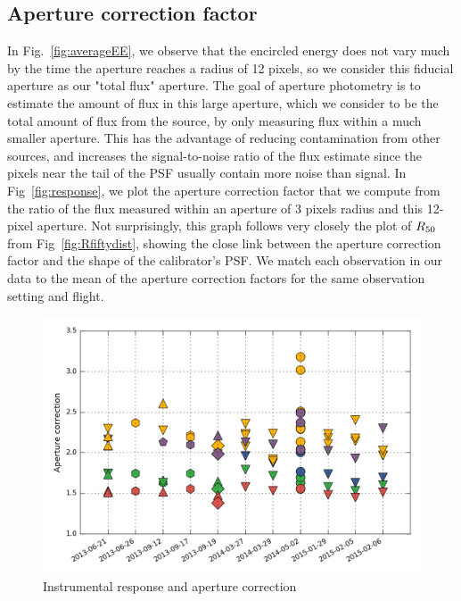 \subsection{Aperture correction factor}
\label{subsec:apcorr}
In Fig.~\ref{fig:averageEE}, we observe that the encircled energy does not vary much by the time the aperture reaches a radius of 12 pixels, so we consider this fiducial aperture as our "total flux" aperture. The goal of aperture photometry is to estimate the amount of flux in this large aperture, which we consider to be the total amount of flux from the source, by only measuring flux within a much smaller aperture. This has the advantage of reducing contamination from other sources, and increases the signal-to-noise ratio of the flux estimate since the pixels near the tail of the PSF usually contain more noise than signal. 
In Fig~\ref{fig:response}, we plot the aperture correction factor that we compute from the ratio of the flux measured within an aperture of 3 pixels radius and this 12-pixel aperture.  Not surprisingly, this graph follows very closely the plot of $R_{50}$ from Fig~\ref{fig:Rfiftydist}, showing the close link between the aperture correction factor and the shape of the calibrator's PSF. We match each observation in our data to the mean of the aperture correction factors for the same observation setting and flight.

\begin{figure}[!h]
\begin{center}
\includegraphics[width=\textwidth]{Figures/Aper_corr.png}
\vspace{-0.5cm}
\caption[aperture correction]{Instrumental response and aperture correction}
\label{fig:apercorr}
\end{center}
\end{figure}



